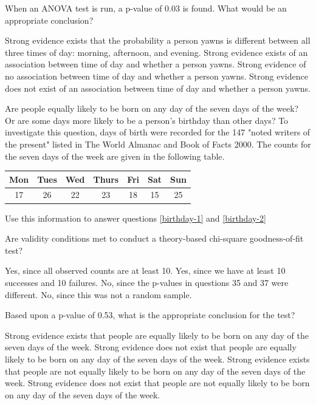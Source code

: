 \documentclass{article}
\begin{document}
\begin{mcquestions}
		\question When an ANOVA test is run, a p-value of 0.03 is found. What would be an appropriate conclusion?
		\begin{mcanswerslist}
			\answer Strong evidence exists that the probability a person yawns is different between all three times of day: morning, afternoon, and evening.
			\answer[correct] Strong evidence exists of an association between time of day and whether a person yawns.
			\answer Strong evidence of no association between time of day and whether a person yawns.
			\answer Strong evidence does not exist of an association between time of day and whether a person yawns.
		\end{mcanswerslist}
		
		\begin{mcquestioninstruction}
			Are people equally likely to be born on any day of the seven days of the week? Or are some days more likely to be a person's birthday than other days?  To investigate this question, days of birth were recorded for the 147 "noted writers of the present" listed in The World Almanac and Book of Facts 2000. The counts for the seven days of the week are given in the following table.
			\begin{center}
				\begin{tabular}{ccccccc}
					Mon&Tues&Wed&Thurs&Fri&Sat&Sun\\ \hline
					17&26&22&23&18&15&25					
				\end{tabular}
			\end{center}
			Use this information to answer questions \ref{birthday-1} and \ref{birthday-2}
		\end{mcquestioninstruction}
		\question Are validity conditions met to conduct a theory-based chi-square goodness-of-fit test? \label{birthday-1}
		\begin{mcanswerslist}
			\answer[correct]  Yes, since all observed counts are at least 10.
			\answer  Yes, since we have at least 10 successes and 10 failures.
			\answer  No, since the p-values in questions 35 and 37 were different.
			\answer  No, since this was not a random sample.
		\end{mcanswerslist}
		
		\question[follow] Based upon a p-value of 0.53, what is the appropriate conclusion for the test? \label{birthday-2}
		\begin{mcanswerslist}
			\answer  Strong evidence exists that people are equally likely to be born on any day of the seven days of the week.
			\answer  Strong evidence does not exist that people are equally likely to be born on any day of the seven days of the week.
			\answer  Strong evidence exists that people are not equally likely to be born on any day of the seven days of the week.
			\answer[correct]  Strong evidence does not exist that people are not equally likely to be born on any day of the seven days of the week.
		\end{mcanswerslist}
		

\end{mcquestions}
\end{document}
